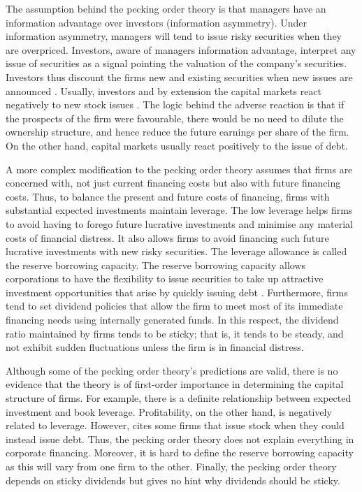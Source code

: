 \documentclass[a4paper,nobind]{templates/ociamthesis}
\begin{document}
The assumption behind the pecking order theory is that managers have an information advantage over investors (information asymmetry). Under information asymmetry, managers will tend to issue risky securities when they are overpriced. Investors, aware of managers information advantage, interpret any issue of securities as a signal pointing the valuation of the company's securities. Investors thus discount the firms new and existing securities when new issues are announced \autocite{fama2002testing}. Usually, investors and by extension the capital markets react negatively to new stock issues \autocite{myers1984capital,chirinko2000testing}. The logic behind the adverse reaction is that if the prospects of the firm were favourable, there would be no need to dilute the ownership structure, and hence reduce the future earnings per share of the firm. On the other hand, capital markets usually react positively to the issue of debt.

A more complex modification to the pecking order theory assumes that firms are concerned with, not just current financing costs but also with future financing costs. Thus, to balance the present and future costs of financing, firms with substantial expected investments maintain leverage. The low leverage helps firms to avoid having to forego future lucrative investments and minimise any material costs of financial distress. It also allows firms to avoid financing such future lucrative investments with new risky securities.
The leverage allowance is called the reserve borrowing capacity. The reserve borrowing capacity allows corporations to have the flexibility to issue securities to take up attractive investment opportunities that arise by quickly issuing debt \autocite{ehrhardt2016corporate}. Furthermore, firms tend to set dividend policies that allow the firm to meet most of its immediate financing needs using internally generated funds. In this respect, the dividend ratio maintained by firms tends to be sticky; that is, it tends to be steady, and not exhibit sudden fluctuations unless the firm is in financial distress.

Although some of the pecking order theory's predictions are valid, there is no evidence that the theory is of first-order importance in determining the capital structure of firms. For example, there is a definite relationship between expected investment and book leverage. Profitability, on the other hand, is negatively related to leverage. However, \textcite{myers1984corporate} cites some firms that issue stock when they could instead issue debt. Thus, the pecking order theory does not explain everything in corporate financing.
Moreover, it is hard to define the reserve borrowing capacity as this will vary from one firm to the other. Finally, the pecking order theory depends on sticky dividends but gives no hint why dividends should be sticky.
\end{document}
